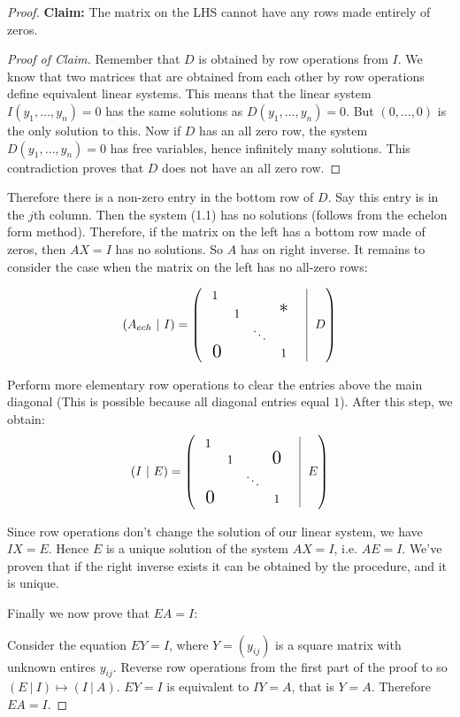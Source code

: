\documentclass[10pt]{scrartcl}
\begin{document}
\begin{proof}
 \textbf{Claim:} The matrix on the LHS cannot have any rows made entirely of zeros.
\begin{proof}[Proof of Claim]
Remember that $D$ is obtained by row operations from $I$. We know that two matrices that are obtained from each other by row operations define equivalent linear systems. This means that the linear system $I(y_1,\dots,y_n) = 0$ has the same solutions as $D(y_1,\dots,y_n) = 0$. But $(0,\dots,0)$ is the only solution to this. Now if $D$ has an all zero row, the system $D(y_1,\dots,y_n) = 0$ has free variables, hence infinitely many solutions. This contradiction proves that $D$ does not have an all zero row. 
\end{proof}

Therefore there is a non-zero entry in the bottom row of $D$. Say this entry is in the $j$th column. Then the system (1.1) has no solutions (follows from the echelon form method). Therefore, if the matrix on the left has a bottom row made of zeros, then $AX = I$ has no solutions. So $A$ has on right inverse. It remains to consider the case when the matrix on the left has no all-zero rows:

\[(A_{ech} ~|~ I) =\left(
    \begin{array}{ccccc |}
    1    &       &    &     & \\ 
  & 1       &    &  \scalebox{1.5}{*}   & \\ 
          &    & \ddots     &    & \\ 
       ~\scalebox{1.5}{$0$}   &  &  & 1     &  \\ 
  \end{array} ~~D \right) \]
  
 Perform more elementary row operations to clear the entries above the main diagonal (This is possible because all diagonal entries equal $1$). After this step, we obtain: 
\[(I~|~ E) =\left(
    \begin{array}{ccccc |}
    1    &       &    &     & \\ 
  & 1       &    &  \scalebox{1.5}{$0$}   & \\ 
          &    & \ddots     &    & \\ 
       ~\scalebox{1.5}{$0$}   &  &  & 1     &  \\ 
  \end{array} ~~E \right) \]
  
  Since row operations don't change the solution of our linear system, we have $IX = E$. Hence $E$ is a unique solution of the system $AX = I$, i.e. $AE = I$. We've proven that if the right inverse exists it can be obtained by the procedure, and it is unique.
  
    Finally we now prove that $EA = I$:
 
   Consider the equation $EY = I$, where $Y = (y_{ij})$ is a square matrix with unknown entires $y_{ij}$.  Reverse row operations from the first part of the proof to so $(E ~|~ I) \mapsto (I ~|~ A)$.  $EY = I$ is equivalent to $IY = A$, that is $Y = A$. Therefore $EA = I$. 
\end{proof}\vspace*{5pt}
\end{document}
